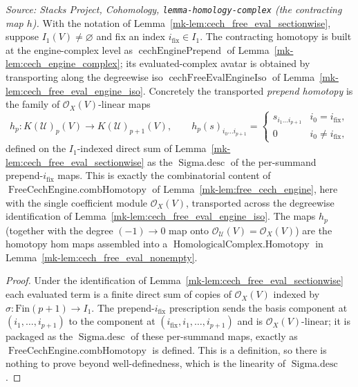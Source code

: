 \begin{lemma}
  \label{mk-lem:cech_free_eval_prepend_homotopy}
  \textit{Source: Stacks Project, Cohomology, \texttt{lemma-homology-complex}
  (the contracting map \(h\)).}
  With the notation of Lemma~\ref{mk-lem:cech_free_eval_sectionwise}, suppose
  \(I_1(V) \neq \varnothing\) and fix an index \(i_{\mathrm{fix}} \in I_1\). The
  contracting homotopy is built at the engine-complex level as
  \(\operatorname{cechEnginePrepend}\) of Lemma~\ref{mk-lem:cech_engine_complex}; its
  evaluated-complex avatar is obtained by transporting along the degreewise iso
  \(\operatorname{cechFreeEvalEngineIso}\) of
  Lemma~\ref{mk-lem:cech_free_eval_engine_iso}. Concretely the transported
  \emph{prepend homotopy} is the family of \(\mathcal{O}_X(V)\)-linear maps
  \[
    h_p : K(\mathcal{U})_p(V) \longrightarrow K(\mathcal{U})_{p+1}(V),
    \qquad
    h_p(s)_{i_0 \ldots i_{p+1}} =
      \begin{cases}
        s_{i_1 \ldots i_{p+1}} & i_0 = i_{\mathrm{fix}}, \\
        0 & i_0 \neq i_{\mathrm{fix}},
      \end{cases}
  \]
  defined on the \(I_1\)-indexed direct sum of
  Lemma~\ref{mk-lem:cech_free_eval_sectionwise} as the \(\operatorname{Sigma.desc}\) of
  the per-summand prepend-\(i_{\mathrm{fix}}\) maps. This is exactly the
  combinatorial content of \(\operatorname{FreeCechEngine.combHomotopy}\) of
  Lemma~\ref{mk-lem:free_cech_engine}, here with the single
  coefficient module \(\mathcal{O}_X(V)\), transported across the degreewise
  identification of Lemma~\ref{mk-lem:cech_free_eval_engine_iso}. The maps \(h_p\) (together with the
  degree \((-1)\!\to\!0\) map onto \(\mathcal{O}_{\mathcal{U}}(V) = \mathcal{O}_X(V)\))
  are the homotopy hom maps assembled into a
  \(\operatorname{HomologicalComplex.Homotopy}\) in
  Lemma~\ref{mk-lem:cech_free_eval_nonempty}.
\end{lemma}

\begin{proof}
  Under the identification of Lemma~\ref{mk-lem:cech_free_eval_sectionwise} each
  evaluated term is a finite direct sum of copies of \(\mathcal{O}_X(V)\) indexed by
  \(\sigma : \mathrm{Fin}(p+1) \to I_1\). The prepend-\(i_{\mathrm{fix}}\) prescription
  sends the basis component at \((i_1, \ldots, i_{p+1})\) to the component at
  \((i_{\mathrm{fix}}, i_1, \ldots, i_{p+1})\) and is \(\mathcal{O}_X(V)\)-linear; it is
  packaged as the \(\operatorname{Sigma.desc}\) of these per-summand maps, exactly as
  \(\operatorname{FreeCechEngine.combHomotopy}\) is defined. This is a definition,
  so there is nothing to prove beyond well-definedness, which is the linearity of
  \(\operatorname{Sigma.desc}\).
\end{proof}

